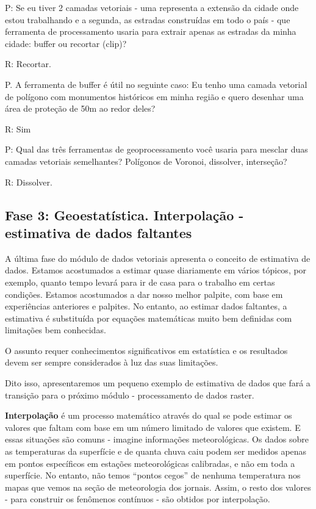 \documentclass[
]{book}
\begin{document}
P: Se eu tiver 2 camadas vetoriais - uma representa a extensão da cidade onde estou trabalhando e a segunda, as estradas construídas em todo o país - que ferramenta de processamento usaria para extrair apenas as estradas da minha cidade: buffer ou recortar (clip)?

R: Recortar.

P. A ferramenta de buffer é útil no seguinte caso: Eu tenho uma camada vetorial de polígono com monumentos históricos em minha região e quero desenhar uma área de proteção de 50m ao redor deles?

R: Sim

P: Qual das três ferramentas de geoprocessamento você usaria para mesclar duas camadas vetoriais semelhantes? Polígonos de Voronoi, dissolver, interseção?

R: Dissolver.

\hypertarget{fase-3-geoestatuxedstica.-interpolauxe7uxe3o---estimativa-de-dados-faltantes}{%
\subsection{Fase 3: Geoestatística. Interpolação - estimativa de dados faltantes}\label{fase-3-geoestatuxedstica.-interpolauxe7uxe3o---estimativa-de-dados-faltantes}}

A última fase do módulo de dados vetoriais apresenta o conceito de estimativa de dados. Estamos acostumados a estimar quase diariamente em vários tópicos, por exemplo, quanto tempo levará para ir de casa para o trabalho em certas condições. Estamos acostumados a dar nosso melhor palpite, com base em experiências anteriores e palpites. No entanto, ao estimar dados faltantes, a estimativa é substituída por equações matemáticas muito bem definidas com limitações bem conhecidas.

O assunto requer conhecimentos significativos em estatística e os resultados devem ser sempre considerados à luz das suas limitações.

Dito isso, apresentaremos um pequeno exemplo de estimativa de dados que fará a transição para o próximo módulo - processamento de dados raster.

\textbf{Interpolação} é um processo matemático através do qual se pode estimar os valores que faltam com base em um número limitado de valores que existem. E essas situações são comuns - imagine informações meteorológicas. Os dados sobre as temperaturas da superfície e de quanta chuva caiu podem ser medidos apenas em pontos específicos em estações meteorológicas calibradas, e não em toda a superfície. No entanto, não temos ``pontos cegos'' de nenhuma temperatura nos mapas que vemos na seção de meteorologia dos jornais. Assim, o resto dos valores - para construir os fenômenos contínuos - são obtidos por interpolação.
\end{document}
